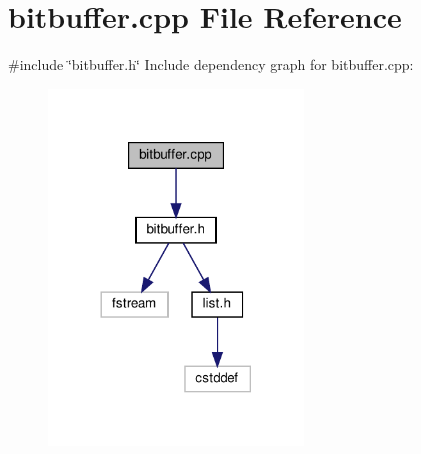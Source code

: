 \section{bitbuffer.\+cpp File Reference}
\label{bitbuffer_8cpp}
{\ttfamily \#include \char`\"{}bitbuffer.\+h\char`\"{}}\newline
Include dependency graph for bitbuffer.\+cpp\+:
\nopagebreak
\begin{figure}[H]
\begin{center}
\leavevmode
\includegraphics[width=192pt]{bitbuffer_8cpp__incl}
\end{center}
\end{figure}
